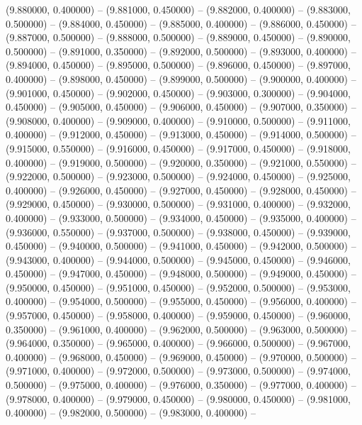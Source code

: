 (9.880000, 0.400000) -- 
(9.881000, 0.450000) -- 
(9.882000, 0.400000) -- 
(9.883000, 0.500000) -- 
(9.884000, 0.450000) -- 
(9.885000, 0.400000) -- 
(9.886000, 0.450000) -- 
(9.887000, 0.500000) -- 
(9.888000, 0.500000) -- 
(9.889000, 0.450000) -- 
(9.890000, 0.500000) -- 
(9.891000, 0.350000) -- 
(9.892000, 0.500000) -- 
(9.893000, 0.400000) -- 
(9.894000, 0.450000) -- 
(9.895000, 0.500000) -- 
(9.896000, 0.450000) -- 
(9.897000, 0.400000) -- 
(9.898000, 0.450000) -- 
(9.899000, 0.500000) -- 
(9.900000, 0.400000) -- 
(9.901000, 0.450000) -- 
(9.902000, 0.450000) -- 
(9.903000, 0.300000) -- 
(9.904000, 0.450000) -- 
(9.905000, 0.450000) -- 
(9.906000, 0.450000) -- 
(9.907000, 0.350000) -- 
(9.908000, 0.400000) -- 
(9.909000, 0.400000) -- 
(9.910000, 0.500000) -- 
(9.911000, 0.400000) -- 
(9.912000, 0.450000) -- 
(9.913000, 0.450000) -- 
(9.914000, 0.500000) -- 
(9.915000, 0.550000) -- 
(9.916000, 0.450000) -- 
(9.917000, 0.450000) -- 
(9.918000, 0.400000) -- 
(9.919000, 0.500000) -- 
(9.920000, 0.350000) -- 
(9.921000, 0.550000) -- 
(9.922000, 0.500000) -- 
(9.923000, 0.500000) -- 
(9.924000, 0.450000) -- 
(9.925000, 0.400000) -- 
(9.926000, 0.450000) -- 
(9.927000, 0.450000) -- 
(9.928000, 0.450000) -- 
(9.929000, 0.450000) -- 
(9.930000, 0.500000) -- 
(9.931000, 0.400000) -- 
(9.932000, 0.400000) -- 
(9.933000, 0.500000) -- 
(9.934000, 0.450000) -- 
(9.935000, 0.400000) -- 
(9.936000, 0.550000) -- 
(9.937000, 0.500000) -- 
(9.938000, 0.450000) -- 
(9.939000, 0.450000) -- 
(9.940000, 0.500000) -- 
(9.941000, 0.450000) -- 
(9.942000, 0.500000) -- 
(9.943000, 0.400000) -- 
(9.944000, 0.500000) -- 
(9.945000, 0.450000) -- 
(9.946000, 0.450000) -- 
(9.947000, 0.450000) -- 
(9.948000, 0.500000) -- 
(9.949000, 0.450000) -- 
(9.950000, 0.450000) -- 
(9.951000, 0.450000) -- 
(9.952000, 0.500000) -- 
(9.953000, 0.400000) -- 
(9.954000, 0.500000) -- 
(9.955000, 0.450000) -- 
(9.956000, 0.400000) -- 
(9.957000, 0.450000) -- 
(9.958000, 0.400000) -- 
(9.959000, 0.450000) -- 
(9.960000, 0.350000) -- 
(9.961000, 0.400000) -- 
(9.962000, 0.500000) -- 
(9.963000, 0.500000) -- 
(9.964000, 0.350000) -- 
(9.965000, 0.400000) -- 
(9.966000, 0.500000) -- 
(9.967000, 0.400000) -- 
(9.968000, 0.450000) -- 
(9.969000, 0.450000) -- 
(9.970000, 0.500000) -- 
(9.971000, 0.400000) -- 
(9.972000, 0.500000) -- 
(9.973000, 0.500000) -- 
(9.974000, 0.500000) -- 
(9.975000, 0.400000) -- 
(9.976000, 0.350000) -- 
(9.977000, 0.400000) -- 
(9.978000, 0.400000) -- 
(9.979000, 0.450000) -- 
(9.980000, 0.450000) -- 
(9.981000, 0.400000) -- 
(9.982000, 0.500000) -- 
(9.983000, 0.400000) -- 
